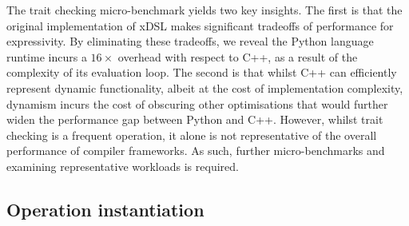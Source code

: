 The trait checking micro-benchmark yields two key insights.
The first is that the original implementation of xDSL makes significant tradeoffs of performance for expressivity. By eliminating these tradeoffs, we reveal the Python language runtime incurs a $16\times$ overhead with respect to C++, as a result of the complexity of its evaluation loop.
The second is that whilst C++ can efficiently represent dynamic functionality, albeit at the cost of implementation complexity, dynamism incurs the cost of obscuring other optimisations that would further widen the performance gap between Python and C++.
However, whilst trait checking is a frequent operation, it alone is not representative of the overall performance of compiler frameworks. As such, further micro-benchmarks and examining representative workloads is required.





\subsection{Operation instantiation}
\label{ssec:op-instantiation}







